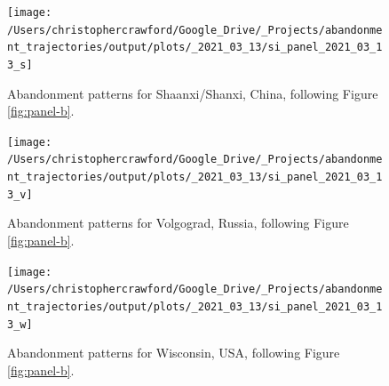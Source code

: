 \documentclass[
]{article}
\begin{document}
\begin{figure}
\texttt{[image: /Users/christophercrawford/Google\_Drive/\_Projects/abandonment\_trajectories/output/plots/\_2021\_03\_13/si\_panel\_2021\_03\_13\_s]} \caption{Abandonment patterns for Shaanxi/Shanxi, China, following Figure \ref{fig:panel-b}.}\label{fig:panel-s}
\end{figure}

\begin{figure}
\texttt{[image: /Users/christophercrawford/Google\_Drive/\_Projects/abandonment\_trajectories/output/plots/\_2021\_03\_13/si\_panel\_2021\_03\_13\_v]} \caption{Abandonment patterns for Volgograd, Russia, following Figure \ref{fig:panel-b}.}\label{fig:panel-v}
\end{figure}

\begin{figure}
\texttt{[image: /Users/christophercrawford/Google\_Drive/\_Projects/abandonment\_trajectories/output/plots/\_2021\_03\_13/si\_panel\_2021\_03\_13\_w]} \caption{Abandonment patterns for Wisconsin, USA, following Figure \ref{fig:panel-b}.}\label{fig:panel-w}
\end{figure}
\end{document}
